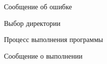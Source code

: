 \begin{figure}[h!]
\caption{ Сообщение об ошибке }
\label{ship_2:ship_2}
\end{figure}

\begin{figure}[h!]
\caption{ Выбор директории }
\label{ship_3:ship_3}
\end{figure}

\begin{figure}[h!]
\caption{ Процесс выполнения программы }
\label{ship_4:ship_4}
\end{figure}

\begin{figure}[h!]
\caption{ Сообщение о выполнении }
\label{ship_5:ship_5}
\end{figure}







